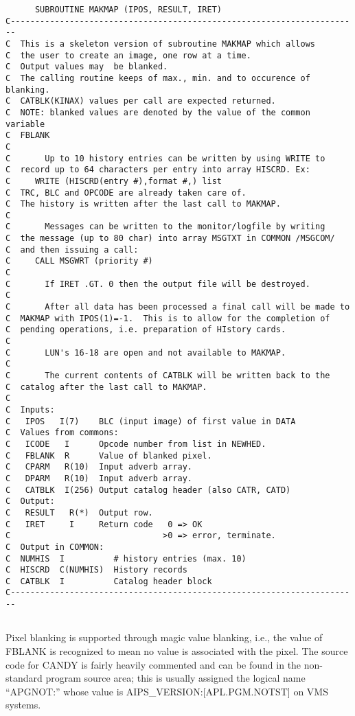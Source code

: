 \begin{verbatim}
      SUBROUTINE MAKMAP (IPOS, RESULT, IRET)
C-----------------------------------------------------------------------
C  This is a skeleton version of subroutine MAKMAP which allows
C  the user to create an image, one row at a time.
C  Output values may  be blanked.
C  The calling routine keeps of max., min. and to occurence of blanking.
C  CATBLK(KINAX) values per call are expected returned.
C  NOTE: blanked values are denoted by the value of the common variable
C  FBLANK
C
C       Up to 10 history entries can be written by using WRITE to
C  record up to 64 characters per entry into array HISCRD. Ex:
C     WRITE (HISCRD(entry #),format #,) list
C  TRC, BLC and OPCODE are already taken care of.
C  The history is written after the last call to MAKMAP.
C
C       Messages can be written to the monitor/logfile by writing
C  the message (up to 80 char) into array MSGTXT in COMMON /MSGCOM/
C  and then issuing a call:
C     CALL MSGWRT (priority #)
C
C       If IRET .GT. 0 then the output file will be destroyed.
C
C       After all data has been processed a final call will be made to
C  MAKMAP with IPOS(1)=-1.  This is to allow for the completion of
C  pending operations, i.e. preparation of HIstory cards.
C
C       LUN's 16-18 are open and not available to MAKMAP.
C
C       The current contents of CATBLK will be written back to the
C  catalog after the last call to MAKMAP.
C
C  Inputs:
C   IPOS   I(7)    BLC (input image) of first value in DATA
C  Values from commons:
C   ICODE   I      Opcode number from list in NEWHED.
C   FBLANK  R      Value of blanked pixel.
C   CPARM   R(10)  Input adverb array.
C   DPARM   R(10)  Input adverb array.
C   CATBLK  I(256) Output catalog header (also CATR, CATD)
C  Output:
C   RESULT   R(*)  Output row.
C   IRET     I     Return code   0 => OK
C                               >0 => error, terminate.
C  Output in COMMON:
C  NUMHIS  I          # history entries (max. 10)
C  HISCRD  C(NUMHIS)  History records
C  CATBLK  I          Catalog header block
C-----------------------------------------------------------------------


\end{verbatim}
Pixel blanking is supported through magic value blanking, i.e., the
value of FBLANK is recognized to mean no value is associated with the
pixel. The source code for CANDY is fairly heavily commented and can
be found in the non-standard program source area; this is usually
assigned the logical name ``APGNOT:'' whose value is
AIPS\_VERSION:[APL.PGM.NOTST] on VMS systems.

